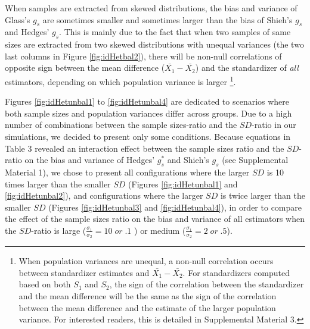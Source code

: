 \documentclass[
  english,
  man,floatsintext]{apa6}
\begin{document}
When samples are extracted from skewed distributions, the bias and variance of Glass's \(g_s\) are sometimes smaller and sometimes larger than the bias of Shieh's \(g_s\) and Hedges' \(g_s\). This is mainly due to the fact that when two samples of same sizes are extracted from two skewed distributions with unequal variances (the two last columns in Figure \ref{fig:idHetbal2}), there will be non-null correlations of opposite sign between the mean difference (\(\bar{X_1}-\bar{X_2}\)) and the standardizer of \emph{all} estimators, depending on which population variance is larger \footnote{When population variances are unequal, a non-null correlation occurs between standardizer estimates and $\bar{X_1}-\bar{X_2}$. For standardizers computed based on both $S_1$ and $S_2$, the sign of the correlation between the standardizer and the mean difference will be the same as the sign of the correlation between the mean difference and the estimate of the larger population variance. For interested readers, this is detailed in Supplemental Material 3.}.

Figures \ref{fig:idHetunbal1} to \ref{fig:idHetunbal4} are dedicated to scenarios where both sample sizes and population variances differ across groups. Due to a high number of combinations between the sample sizes-ratio and the \(SD\)-ratio in our simulations, we decided to present only some conditions. Because equations in Table 3 revealed an interaction effect between the sample sizes ratio and the \(SD\)-ratio on the bias and variance of Hedges' \(g^*_s\) and Shieh's \(g_s\) (see Supplemental Material 1), we chose to present all configurations where the larger \(SD\) is 10 times larger than the smaller \(SD\) (Figures \ref{fig:idHetunbal1} and \ref{fig:idHetunbal2}), and configurations where the larger \(SD\) is twice larger than the smaller \(SD\) (Figures \ref{fig:idHetunbal3} and \ref{fig:idHetunbal4}), in order to compare the effect of the sample sizes ratio on the bias and variance of all estimators when the \(SD\)-ratio is large (\(\frac{\sigma_1}{\sigma_2}=10 \; or \; .1\) ) or medium (\(\frac{\sigma_1}{\sigma_2}=2 \; or \; .5\)).
\end{document}
